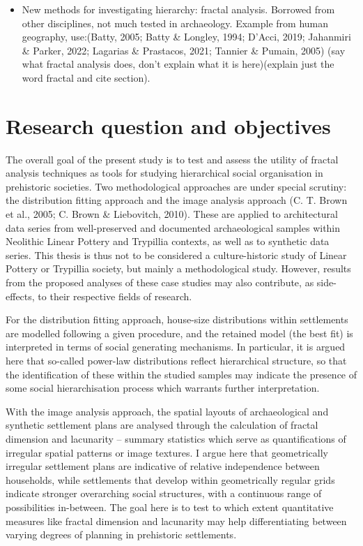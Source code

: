 \documentclass[
  12pt,
]{book}
\begin{document}
\begin{itemize}
\item
  New methods for investigating hierarchy: fractal analysis. Borrowed from other disciplines, not much tested in archaeology. Example from human geography, use:(Batty, 2005; Batty \& Longley, 1994; D'Acci, 2019; Jahanmiri \& Parker, 2022; Lagarias \& Prastacos, 2021; Tannier \& Pumain, 2005) (say what fractal analysis does, don't explain what it is here)(explain just the word fractal and cite section).
\end{itemize}

\hypertarget{research-question-and-objectives}{%
\section{Research question and objectives}\label{research-question-and-objectives}}

The overall goal of the present study is to test and assess the utility of fractal analysis techniques as tools for studying hierarchical social organisation in prehistoric societies. Two methodological approaches are under special scrutiny: the distribution fitting approach and the image analysis approach (C. T. Brown et al., 2005; C. Brown \& Liebovitch, 2010). These are applied to architectural data series from well-preserved and documented archaeological samples within Neolithic Linear Pottery and Trypillia contexts, as well as to synthetic data series. This thesis is thus not to be considered a culture-historic study of Linear Pottery or Trypillia society, but mainly a methodological study. However, results from the proposed analyses of these case studies may also contribute, as side-effects, to their respective fields of research.

For the distribution fitting approach, house-size distributions within settlements are modelled following a given procedure, and the retained model (the best fit) is interpreted in terms of social generating mechanisms. In particular, it is argued here that so-called power-law distributions reflect hierarchical structure, so that the identification of these within the studied samples may indicate the presence of some social hierarchisation process which warrants further interpretation.

With the image analysis approach, the spatial layouts of archaeological and synthetic settlement plans are analysed through the calculation of fractal dimension and lacunarity -- summary statistics which serve as quantifications of irregular spatial patterns or image textures. I argue here that geometrically irregular settlement plans are indicative of relative independence between households, while settlements that develop within geometrically regular grids indicate stronger overarching social structures, with a continuous range of possibilities in-between. The goal here is to test to which extent quantitative measures like fractal dimension and lacunarity may help differentiating between varying degrees of planning in prehistoric settlements.
\end{document}
